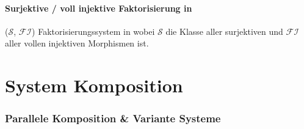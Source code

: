 \paragraph{ Surjektive / voll injektive Faktorisierung in \syssig}
($\mathcal{S}$, $\mathcal{FI}$) Faktorisierungssystem in \syssig wobei $\mathcal{S}$ die Klasse aller surjektiven und $\mathcal{FI}$ aller vollen injektiven Morphismen ist.

\newpage


\section{System Komposition}

\subsubsection{Parallele Komposition \& Variante Systeme}


